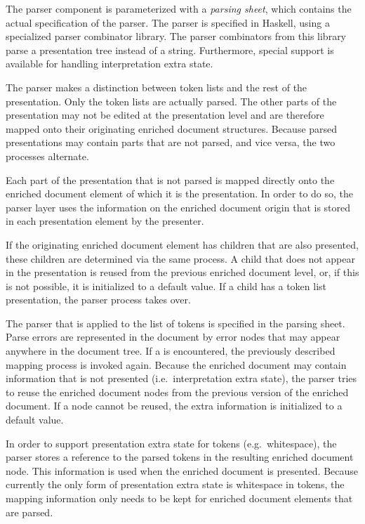 The parser component is parameterized with a {\em parsing sheet}, which contains the actual specification of the parser. The parser is specified in Haskell, using a specialized parser combinator library. The parser combinators from this library parse a presentation tree instead of a string. Furthermore, special support is available for handling interpretation extra state.

The parser makes a distinction between token lists and the rest of the presentation. Only the token lists are actually parsed. The other parts of the presentation may not be edited at the presentation level and are therefore mapped onto their originating enriched document structures. Because parsed presentations may contain parts that are not parsed, and vice versa, the two processes alternate.

Each part of the presentation that is not parsed is mapped directly onto the enriched document element of which it is the presentation. In order to do so, the parser layer uses the information on the enriched document origin that is stored in each presentation element by the presenter.

If the originating enriched document element has children that are also presented, these children are determined via the same process. A child that does not appear in the presentation is reused from the previous enriched document level, or, if this is not possible, it is initialized to a default value. If a child has a token list presentation, the parser process takes over.

The parser that is applied to the list of tokens is specified  in the parsing sheet. Parse errors are represented in the document by error nodes that may appear anywhere in the document tree. If a  is encountered, the previously described mapping process is invoked again. Because the enriched document may contain information that is not presented (i.e.\ interpretation extra state), the parser tries to reuse the enriched document nodes from the previous version of the enriched document. If a node cannot be reused, the extra information is initialized to a default value. 

In order to support presentation extra state for tokens (e.g.\ whitespace), the parser stores a reference to the parsed tokens in the resulting enriched document node. This information is used when the enriched document is presented. Because currently the only form of presentation extra state is whitespace in tokens, the mapping information only needs to be kept for enriched document elements that are parsed.

